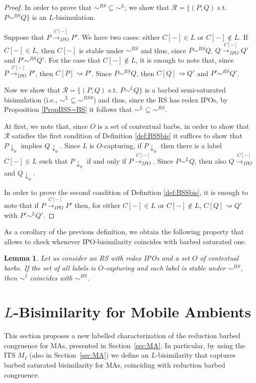 \documentclass[copyright,creativecommons]{eptcs}
\makeatletter
\newcommand{\bisl}{\sim^{L}}
\def\IPOtr#1{\stackrel{#1}{\rightarrowfill_{IPO}}}
\def \rightarrowfill{\m@th\mathord{\smash-}\mkern-6mu\cleaders\hbox{$\mkern-2mu\mathord{\smash-}\mkern-2mu$}\hfill
  \mkern-6mu\mathord\rightarrow}
\newcommand{\barb}[1]{\downarrow_{#1}}
\newcommand{\bsbis}{\sim^{BS}}
\newcommand{\bssbis}{\sim^{BSS}}
\def\IPOtr#1{\stackrel{#1}{\rightarrow_{IPO}}}
\newcommand{\react}{\rightsquigarrow}
\newcommand{\<}{\langle}
\renewcommand{\>}{\rangle}
\def \rightarrowfill{\m@th\mathord{\smash-}\mkern-6mu\cleaders\hbox{$\mkern-2mu\mathord{\smash-}\mkern-2mu$}\hfill
  \mkern-6mu\mathord\rightarrow}
\newtheorem{lemma}{Lemma}{}
\makeatother
\begin{document}
\begin{proof}
In order to prove that $\bsbis \subseteq \bisl$, we show that
$\mathcal R=\{(P,Q)$ s.t. $P\bsbis Q \}$ is an
$L$-bisimulation.

Suppose that $P \IPOtr{C[-]}P'$. We have two cases: either $C[-]\in
L$ or $C[-]\notin L$. If $C[-]\in L$, then $C[-]$ is stable under
$\bsbis$ and thus, since $P\bsbis Q$, $Q \IPOtr{C[-]}Q'$ and
$P'\bsbis Q'$. For the case that $C[-]\notin L$, it is enough to
note that, since $P \IPOtr{C[-]}P'$, then $C[P]\react P'$. Since
$P\bsbis Q$, then $C[Q]\react Q'$ and $P' \bsbis Q'$.

Now we show that $\mathcal R=\{(P,Q)$ s.t. $P\bisl Q \}$
is a barbed semi-saturated bisimulation (i.e., $\bisl \subseteq
\bssbis$) and thus, since the RS has redex IPOs, by
Proposition \ref{PropBSS=BS} it follows that $\bisl \subseteq
\bsbis$.

At first, we note that, since $O$ is a set of contextual barbs,
in order to show that $\mathcal R$ satisfies the first condition of
Definition \ref{def:BSSbis} it suffices to show that $P\barb o$
implies $Q\barb o$. Since $L$ is $O$-capturing,  if $P\barb o$
then there is a label $C[-]\in L$ such that $P\barb o$
if and only if $P\IPOtr{C[-]}$. Since $P\bisl Q$, then also
$Q\IPOtr{C[-]}$ and $Q\barb o$.

In order to prove the second condition of Definition
\ref{def:BSSbis}, it is enough to note that if $P\IPOtr{C[-]}P'$
then, for either $C[-]\in L$ or $C[-]\notin L$,
$C[Q]\react Q'$ with $P'\bisl Q'$.
\end{proof}

As a corollary of the previous definition, we obtain the following property
that allows to check whenever IPO-bisimilarity coincides with barbed
saturated one.

\begin{lemma}
  Let us consider an RS with redex IPOs and a set $O$ of contextual
  barbs. If the set of all labels is $O$-capturing and each label is
  stable under $\bsbis$, then $\sim^I$ coincides with $\bsbis$.
\end{lemma}



\section{$L$-Bisimilarity for Mobile Ambients}\label{sec:LbisMA}
This section proposes a new labelled characterization of the
reduction barbed congruence for MAs, presented in Section~\ref{sec:MA}.
In particular, by using the ITS $M_I$ (also
in Section~\ref{sec:MA}) we define an $L$-bisimilarity
that captures barbed saturated bisimilarity for MAs,
coinciding with reduction barbed congruence.
\end{document}
